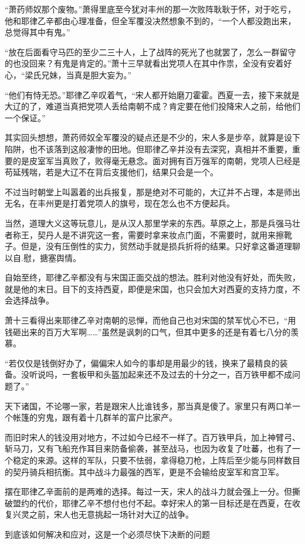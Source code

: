 “萧药师奴那个废物。”萧得里底至今犹对丰州的那一次败阵耿耿于怀，对于吃亏，他和耶律乙辛都由心理准备，但全军覆没决然想象不到的，“一个人都没跑出来，总觉得其中有鬼。”

“放在后面看守马匹的至少二三十人，上了战阵的死光了也就罢了，怎么一群留守的也没回来？有鬼是肯定的。”萧十三早就看出党项人在其中作祟，全没有安着好心，“梁氏兄妹，当真是胆大妄为。”

“他们有恃无恐。”耶律乙辛叹着气，“宋人都开始磨刀霍霍。西夏一去，接下来就是大辽的了，难道当真把党项人丢给南朝不成？肯定要在他们投降宋人之前，给他们一个保证。”

其实回头想想，萧药师奴全军覆没的疑点还是不少的，宋人多是步卒，就算是设下陷阱，也不该落到这般凄惨的田地。但耶律乙辛并没有去深究，真相并不重要，重要的是皮室军当真败了，败得毫无悬念。面对拥有百万强军的南朝，党项人已经是苟延残喘，若是大辽不在背后支援他们，结果只会是一个。

不过当时朝堂上叫嚣着的出兵报复，那是绝对不可能的，大辽并不占理，本是师出无名，在丰州更是打着党项人的旗号，现在怎么也不方便起兵。

当然，道理大义这等玩意儿，是从汉人那里学来的东西。草原之上，那是兵强马壮者称王，契丹人是不讲究这一套，需要时拿来妆点门面，不需要时，就用来擦靴子。但是，没有压倒性的实力，贸然动手就是损兵折将的结果。只好拿这番道理聊以自.慰，搪塞舆情。

自始至终，耶律乙辛都没有与宋国正面交战的想法。胜利对他没有好处，而失败，就是他的末日。目下的支持西夏，即便是宋国，也只会加大对西夏的支持力度，不会选择战争。

萧十三看得出来耶律乙辛对南朝的忌惮，而他自己也对宋国的禁军忧心不已，“用钱砸出来的百万大军啊……”虽然是讽刺的口气，但其中更多的还是有着七八分的羡慕。

“若仅仅是钱倒好办了，偏偏宋人如今的事却是用最少的钱，换来了最精良的装备。没听说吗，一套板甲和头盔加起来还不及过去的十分之一，百万铁甲都不成问题了。”

天下诸国，不论哪一家，若是跟宋人比谁钱多，那当真是傻了。家里只有两口羊一个帐篷的穷鬼，跟有着十几群羊的富户比家产。

而旧时宋人的钱没用对地方，不过如今已经不一样了。百万铁甲兵，加上神臂弓、斩马刀，又有飞船充作耳目来防备偷袭，甚至战马，也因为收复了吐蕃，也有了一个稳定的来源。这样的军队，只要不怯弱，拿得稳刀枪，上阵后至少能与同样数目的契丹骑兵相抗衡。其中战斗力最强的西军，更是不会输给皮室军和宫卫军。

摆在耶律乙辛面前的是两难的选择。每过一天，宋人的战斗力就会强上一分。但撕破盟约的代价，耶律乙辛不想付也付不起。幸好宋人的第一目标还是在西夏，在收复兴灵之前，宋人也无意挑起一场针对大辽的战争。

到底该如何解决和应对，这是一个必须尽快下决断的问题

